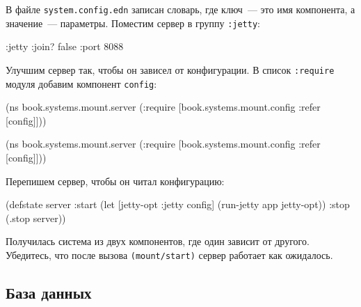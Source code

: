 \fi

В файле \verb|system.config.edn| записан словарь, где ключ~--- это имя компонента, а
значение~--- параметры. Поместим сервер в группу \verb|:jetty|:

\begin{english}
  \begin{clojure}
{:jetty {:join? false :port 8088}}
  \end{clojure}
\end{english}


Улучшим сервер так, чтобы он зависел от конфигурации. В список \verb|:require|
модуля добавим компонент \verb|config|:

\ifx\DEVICETYPE\MOBILE

\begin{english}
  \begin{clojure}
(ns book.systems.mount.server
 (:require
  [book.systems.mount.config
   :refer [config]]))
  \end{clojure}
\end{english}

\else

\begin{english}
  \begin{clojure}
(ns book.systems.mount.server
 (:require
  [book.systems.mount.config :refer [config]]))
  \end{clojure}
\end{english}

\fi

\noindent
Перепишем сервер, чтобы он читал конфигурацию:

\begin{english}
  \begin{clojure}
(defstate server
  :start
  (let [{jetty-opt :jetty} config]
    (run-jetty app jetty-opt))
  :stop
  (.stop server))
  \end{clojure}
\end{english}

Получилась система из двух компонентов, где один зависит от другого. Убедитесь,
что после вызова \verb|(mount/start)| сервер работает как ожидалось.

\subsection{База данных}


